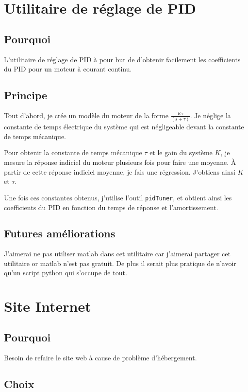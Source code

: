 \documentclass[11pt,a4paper]{report}
\begin{document}
  \section{Utilitaire de réglage de PID}
    \subsection{Pourquoi}
      L'utilitaire de réglage de PID à pour but de d'obtenir facilement les coefficients du PID pour un moteur à courant continu.

    \subsection{Principe}
      Tout d'abord, je crée un modèle du moteur de la forme \(\frac{K\tau}{(s+\tau)}\). Je néglige la constante de temps électrique du système qui est négligeable devant la constante de temps mécanique.

      Pour obtenir la constante de temps mécanique \(\tau \) et le gain du système \(K\), je mesure la réponse indiciel du moteur plusieurs fois pour faire une moyenne. À partir de cette réponse indiciel moyenne, je fais une régression. J'obtiens ainsi \(K\) et \(\tau \).

      Une fois ces constantes obtenus, j'utilise l'outil \texttt{pidTuner}, et obtient ainsi les coefficients du PID en fonction du temps de réponse et l'amortissement.

    \subsection{Futures améliorations}
      J'aimerai ne pas utiliser matlab dans cet utilitaire car j'aimerai partager cet utilitaire or matlab n'est pas gratuit.
      De plus il serait plus pratique de n'avoir qu'un script python qui s'occupe de tout.

  \section{Site Internet}
    \subsection{Pourquoi}
      Besoin de refaire le site web à cause de problème d'hébergement.

    \subsection{Choix}
\end{document}
